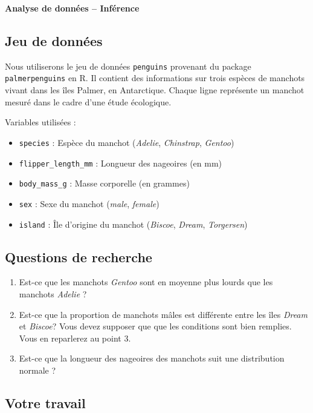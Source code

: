 \documentclass[11pt,french]{article}
\begin{document}
\begin{center}
   \textbf{ Analyse de données -- Inférence}
\end{center}


\subsection*{Jeu de données}

Nous utiliserons le jeu de données \texttt{penguins} provenant du package \texttt{palmerpenguins} en R. Il contient des informations sur trois espèces de manchots vivant dans les îles Palmer, en Antarctique. Chaque ligne représente un manchot mesuré dans le cadre d'une étude écologique.

Variables utilisées :
\begin{itemize}
  \item \texttt{species} : Espèce du manchot (\textit{Adelie}, \textit{Chinstrap}, \textit{Gentoo})
  \item \texttt{flipper\_length\_mm} : Longueur des nageoires (en mm)
  \item \texttt{body\_mass\_g} : Masse corporelle (en grammes)
  \item \texttt{sex} : Sexe du manchot (\textit{male}, \textit{female})
  \item \texttt{island} : Île d’origine du manchot (\textit{Biscoe}, \textit{Dream}, \textit{Torgersen})
\end{itemize}

\subsection*{Questions de recherche}

\begin{enumerate}
  \item Est-ce que les manchots \textit{Gentoo} sont en moyenne plus lourds que les manchots \textit{Adelie} ?
  \item Est-ce que la proportion de manchots mâles est différente entre les îles \textit{Dream} et \textit{Biscoe}? Vous devez supposer que que les conditions sont bien remplies. Vous en reparlerez au point 3.
  \item Est-ce que la longueur des nageoires des manchots suit une distribution normale ?
\end{enumerate}

\subsection*{Votre travail}
\end{document}
